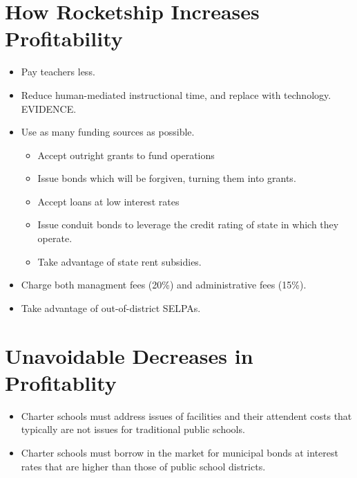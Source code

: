 \section{How Rocketship Increases Profitability}\indent%
\label{sec:how-rock-incr}

\begin{itemize}
  \item Pay teachers less.
  \item Reduce human-mediated instructional time, and replace with technology. EVIDENCE.
  \item Use as many funding sources as possible.
  \begin{itemize}
    \item Accept outright grants to fund operations
    \item Issue bonds which will be forgiven, turning them into grants.
    \item Accept loans at low interest rates
    \item Issue conduit bonds to leverage the credit rating of state in which they operate.
    \item Take advantage of state rent subsidies.
      \end{itemize}
  \item Charge both managment fees (20\%) and administrative fees (15\%). 
  \item Take advantage of out-of-district SELPAs.
\end{itemize}

\section{Unavoidable Decreases in Profitablity}\indent%
\label{sec:unavoidable_decr_profit}

\begin{itemize}
  \item Charter schools must address issues of facilities and their attendent costs that typically are not issues for traditional public schools.
  \item Charter schools must borrow in the market for municipal bonds at interest rates that are higher than those of public school districts.
\end{itemize}

